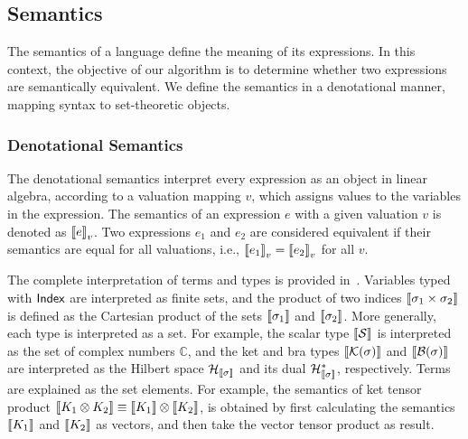 






\subsection{Semantics}

The semantics of a language define the meaning of its expressions. In this context, the objective of our algorithm is to determine whether two expressions are semantically equivalent. We define the semantics in a denotational manner, mapping syntax to set-theoretic objects.

\subsubsection{Denotational Semantics}
The denotational semantics interpret every expression as an object in linear algebra, according to a valuation mapping \( v \), which assigns values to the variables in the expression. The semantics of an expression \( e \) with a given valuation \( v \) is denoted as \( {\llbracket e \rrbracket}_v \). Two expressions \( e_1 \) and \( e_2 \) are considered equivalent if their semantics are equal for all valuations, i.e., \( {\llbracket e_1 \rrbracket}_v = {\llbracket e_2 \rrbracket}_v \) for all \( v \).

The complete interpretation of terms and types is provided in~. Variables typed with \( \mathsf{Index} \) are interpreted as finite sets, and the product of two indices \( {\llbracket \sigma_1 \times \sigma_2 \rrbracket} \) is defined as the Cartesian product of the sets \( {\llbracket \sigma_1 \rrbracket} \) and \( {\llbracket \sigma_2 \rrbracket} \). More generally, each type is interpreted as a set. For example, the scalar type \( {\llbracket \mathcal{S} \rrbracket} \) is interpreted as the set of complex numbers \( \mathbb{C} \), and the ket and bra types \( {\llbracket \mathcal{K}(\sigma) \rrbracket} \) and \( {\llbracket \mathcal{B}(\sigma) \rrbracket} \) are interpreted as the Hilbert space \( \mathcal{H}_{{\llbracket \sigma \rrbracket}} \) and its dual \( \mathcal{H}_{{\llbracket \sigma \rrbracket}}^* \), respectively. Terms are explained as the set elements. For example, the semantics of ket tensor product ${\llbracket K_1 \otimes K_2 \rrbracket} \equiv {\llbracket K_1 \rrbracket} \otimes {\llbracket K_2 \rrbracket}$, is obtained by first calculating the semantics ${\llbracket K_1 \rrbracket}$ and ${\llbracket K_2 \rrbracket}$ as vectors, and then take the vector tensor product as result.


